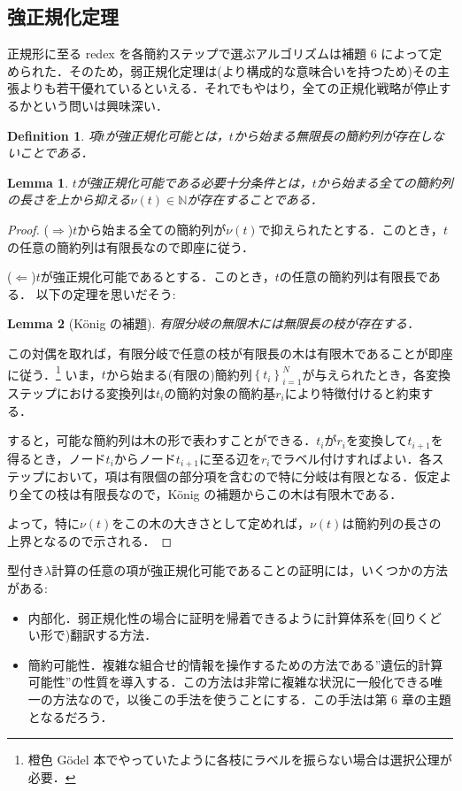\documentclass[a4paper,10pt,platex, dvipdfmx]{jsarticle}
\newtheorem{definition}{Definition}
\newtheorem{lemma}{Lemma}
\begin{document}
\subsection{強正規化定理}
正規形に至る redex を各簡約ステップで選ぶアルゴリズムは補題 6 によって定められた．そのため，弱正規化定理は(より構成的な意味合いを持つため)その主張よりも若干優れているといえる．それでもやはり，全ての正規化戦略が停止するかという問いは興味深い．
\begin{definition}
項$t$が強正規化可能とは，$t$から始まる無限長の簡約列が存在しないことである．
\end{definition}
\begin{lemma}
$t$が強正規化可能である必要十分条件とは，$t$から始まる全ての簡約列の長さを上から抑える$\nu(t)\in\mathbb{N}$が存在することである．
\end{lemma}
\begin{proof}
($\Longrightarrow$)$t$から始まる全ての簡約列が$\nu(t)$で抑えられたとする．このとき，$t$の任意の簡約列は有限長なので即座に従う．

($\Longleftarrow$)$t$が強正規化可能であるとする．このとき，$t$の任意の簡約列は有限長である．
以下の定理を思いだそう:
\begin{lemma}[K\"onig の補題]
有限分岐の無限木には無限長の枝が存在する．
\end{lemma}
この対偶を取れば，有限分岐で任意の枝が有限長の木は有限木であることが即座に従う．\footnote{橙色 G\"odel 本でやっていたように各枝にラベルを振らない場合は選択公理が必要．}
いま，$t$から始まる(有限の)簡約列$\left\{t_{i}\right\}_{i = 1}^{N}$が与えられたとき，各変換ステップにおける変換列は$t_{i}$の簡約対象の簡約基$r_{i}$により特徴付けると約束する．

すると，可能な簡約列は木の形で表わすことができる．$t_{i}$が$r_{i}$を変換して$t_{i +1}$を得るとき，ノード$t_{i}$からノード$t_{i+1}$に至る辺を$r_{i}$でラベル付けすればよい．各ステップにおいて，項は有限個の部分項を含むので特に分岐は有限となる．仮定より全ての枝は有限長なので，K\"onig の補題からこの木は有限木である．

よって，特に$\nu(t)$をこの木の大きさとして定めれば，$\nu(t)$は簡約列の長さの上界となるので示される．
\end{proof}
型付き$\lambda$計算の任意の項が強正規化可能であることの証明には，いくつかの方法がある:\begin{itemize}
\item 内部化．弱正規化性の場合に証明を帰着できるように計算体系を(回りくどい形で)翻訳する方法．
\item 簡約可能性．複雑な組合せ的情報を操作するための方法である''遺伝的計算可能性''の性質を導入する．この方法は非常に複雑な状況に一般化できる唯一の方法なので，以後この手法を使うことにする．この手法は第 6 章の主題となるだろう．
\end{itemize}
\pagebreak
\end{document}
